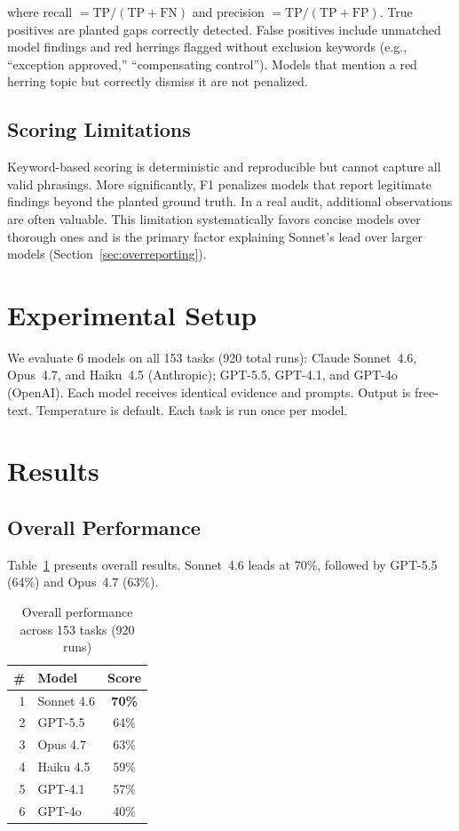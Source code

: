 \documentclass[conference]{IEEEtran}
\begin{document}
where recall $= \text{TP} / (\text{TP} + \text{FN})$ and precision $= \text{TP} / (\text{TP} + \text{FP})$. True positives are planted gaps correctly detected. False positives include unmatched model findings and red herrings flagged without exclusion keywords (e.g., ``exception approved,'' ``compensating control''). Models that mention a red herring topic but correctly dismiss it are not penalized.

\subsection{Scoring Limitations}

Keyword-based scoring is deterministic and reproducible but cannot capture all valid phrasings. More significantly, F1 penalizes models that report legitimate findings beyond the planted ground truth. In a real audit, additional observations are often valuable. This limitation systematically favors concise models over thorough ones and is the primary factor explaining Sonnet's lead over larger models (Section~\ref{sec:overreporting}).

\section{Experimental Setup}

We evaluate 6 models on all 153 tasks (920 total runs): Claude Sonnet~4.6, Opus~4.7, and Haiku~4.5 (Anthropic); GPT-5.5, GPT-4.1, and GPT-4o (OpenAI). Each model receives identical evidence and prompts. Output is free-text. Temperature is default. Each task is run once per model.

\section{Results}

\subsection{Overall Performance}

Table~\ref{tab:results} presents overall results. Sonnet~4.6 leads at 70\%, followed by GPT-5.5 (64\%) and Opus~4.7 (63\%).

\begin{table}[htbp]
\caption{Overall performance across 153 tasks (920 runs)}
\begin{center}
\begin{tabular}{@{}rlc@{}}
\toprule
\# & Model & Score \\
\midrule
1 & Sonnet 4.6 & \textbf{70\%} \\
2 & GPT-5.5 & 64\% \\
3 & Opus 4.7 & 63\% \\
4 & Haiku 4.5 & 59\% \\
5 & GPT-4.1 & 57\% \\
6 & GPT-4o & 40\% \\
\bottomrule
\end{tabular}
\label{tab:results}
\end{center}
\end{table}
\end{document}
